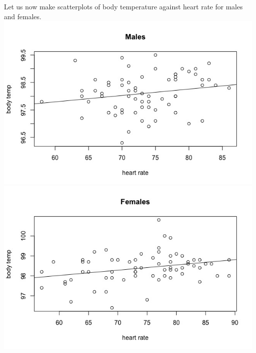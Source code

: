\documentclass[12pt,letterpaper,titlepage,en-US]{article}
\begin{document}
Let us now make scatterplots of body temperature against heart rate for males and females.
\includegraphics[scale=0.6]{male-linear.jpeg}\\
\includegraphics[scale=0.6]{female-linear.jpeg}\\
\end{document}

